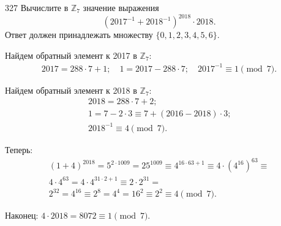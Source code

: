 \begin{task}{327}
Вычислите в $\mathbb{Z}_7$ значение выражения
\[\left(2017^{-1}+2018^{−1}\right)^{2018}\cdot2018.\] Ответ должен принадлежать множеству $\{0,1,2,3,4,5,6\}$.
\end{task}

\begin{solution}


 Найдем обратный элемент к 2017 в $\mathbb{Z}_7$:
 \begin{gather*}
 2017 = 288\cdot7 + 1; \quad
 1 = 2017 - 288\cdot7; \quad
 2017^{-1} \equiv 1 \pmod{7}.
 \end{gather*}\par
 
 Найдем обратный элемент к 2018 в $\mathbb{Z}_7$:
 \begin{gather*}
 2018 = 288\cdot7 + 2\text{;}\\
 1 = 7 - 2\cdot3 \equiv 7 + (2016 - 2018)\cdot3\text{;}\\
 2018^{-1} \equiv 4 \pmod{7}\text{.}
 \end{gather*}\par
 
 Теперь:
 \begin{gather*}
 (1 + 4)^{2018} = 5^{2\cdot1009} = 25^{1009} \equiv 4^{16\cdot63 + 1} \equiv 4\cdot(4^{16})^{63} \equiv \\ 4\cdot4^{63} = 4 \cdot 4^{31\cdot2 + 1} \equiv 2\cdot2^{31} =\\ 2^{32} = 4^{16} \equiv 2^{8} = 4^4 = 16^2 \equiv 2^2 \equiv 4 \pmod{7}.
 \end{gather*}\par
 
 Наконец:
 $4\cdot 2018 = 8072 \equiv 1 \pmod{7}$.
\end{solution}